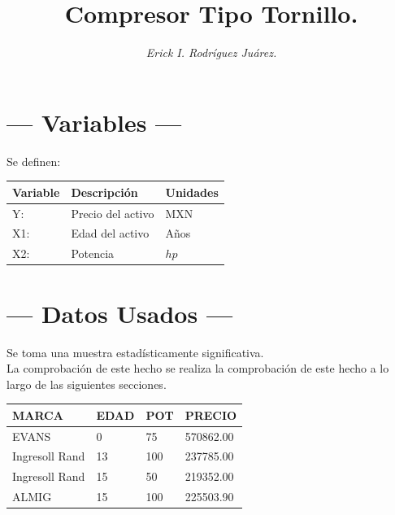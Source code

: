 \documentclass{article}
\title{\sc Compresor Tipo Tornillo.}
\author{\it Erick I. Rodríguez Juárez.}
\begin{document}
\maketitle

\section{\centering --- Variables ---} %
Se definen:
\begin{center}
  \begin{tabular}{|l|l|l|}
    \hline 
    Variable & Descripción   & Unidades\\ \hline 
    Y:  & Precio del activo  & MXN \\ \hline 
    X1: & Edad del activo    & Años \\ \hline 
		X2: & Potencia  & \(hp\) \\ \hline 
  \end{tabular}
\end{center} 

\section{\centering --- Datos Usados ---} %
Se toma una muestra estadísticamente significativa. \\ 
La comprobación de este hecho se realiza la comprobación de este hecho a lo largo de las siguientes secciones.
\begin{center}
	\begin{tabular}{*{4}{|p{2cm}}|}
		\hline 
MARCA          &  EDAD  & POT  & PRECIO\\ \hline
EVANS          &  0     & 75   & 570862.00\\ \hline
Ingresoll Rand &  13    & 100  & 237785.00\\ \hline
Ingresoll Rand &  15    & 50   & 219352.00\\ \hline
ALMIG          &  15    & 100  & 225503.90\\ \hline
	\end{tabular}
\end{center}
\end{document}
